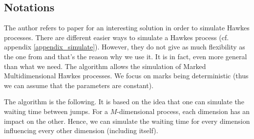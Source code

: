 \subsection{Notations}

The author refers to paper \cite{my_algo_simul} for an interesting solution in order to simulate Hawkes processes. There are different easier ways to simulate a Hawkes process (cf. appendix \ref{appendix_simulate}). However, they do not give as much flexibility as the one from \cite{my_algo_simul} and that's the reason why we use it. It is in fact, even more general than what we need. The algorithm allows the simulation of Marked Multidimensional Hawkes processes. We focus on marks being deterministic (thus we can assume that the parameters are constant).


The algorithm is the following. It is based on the idea that one can simulate the waiting time between jumps. For a $M$-dimensional process, each dimension has an impact on the other. Hence, we can simulate the waiting time for every dimension influencing every other dimension (including itself).




